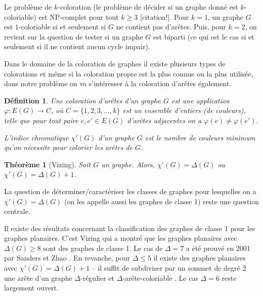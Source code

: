 \documentclass[10pt,a4paper]{article}
\newtheorem{definition}{Définition}
\newtheorem{theorem}{Théorème}
\begin{document}

Le problème de $k$-coloration (le problème de décider si un graphe donné est $k$-coloriable) est NP-complet pour tout $k \geq 3$ {\color{blue}[citation!]}. Pour $k = 1$, un graphe $G$ est $1$-coloriable si et seulement si $G$ ne contient pas d'arêtes. Puis, pour $k =  2$, on revient sur la question de tester si un graphe $G$ est biparti (ce qui est le cas si et seulement si il ne contient aucun cycle impair). 

Dans le domaine de la coloration de graphes il existe plusieurs types de colorations et même si la coloration propre est la plus connue ou la plus utilisée, dans notre problème on va s'intéresser à la coloration d'arêtes également.

\begin{definition}%
Une \emph{coloration d'arêtes} d'un graphe $G$ est une application $\varphi: E(G) \to C$, où $C=\{1,2,3,\dots,k\}$ est un ensemble d'entiers (de \emph{couleurs}), telle que pour tout paire $e, e' \in E(G)$ d'arêtes adjacentes on a $\varphi(e) \neq \varphi(e')$.

L'\emph{indice chromatique} $\chi'(G)$ d'un graphe $G$ est le nombre de couleurs minimum qu'on nécessite pour colorier les arêtes de $G$.
\end{definition}

\begin{theorem}[Vizing]
Soit $G$ un graphe. Alors, $\chi'(G) = \Delta(G)$ ou $\chi'(G) = \Delta(G) + 1$.
\end{theorem}

La question de déterminer/caractériser les classes de graphes pour lesquelles on a $\chi'(G) = \Delta(G)$ (on les appelle aussi les graphes de classe 1) reste une question centrale. 

Il existe des résultats concernant la classification des graphes de classe 1 pour les graphes planaires.
C'est Vizing \cite{Vizing} qui a montré que les graphes planaires avec $\Delta(G)\ge 8$ sont des graphes de classe 1. Le cas de $\Delta = 7$ a été prouvé en 2001 par Sanders et Zhao \cite{SandersZhao}. 
En revanche, pour $\Delta\le 5$ il existe des graphes planaires avec $\chi'(G)=\Delta(G)+1$ -- il suffit de subdiviser par un sommet de degré 2 une arête d'un graphe $\Delta$-régulier et $\Delta$-arête-coloriable \cite{Vizing2}.
Le cas $\Delta = 6$ reste largement ouvert. 
\end{document}
